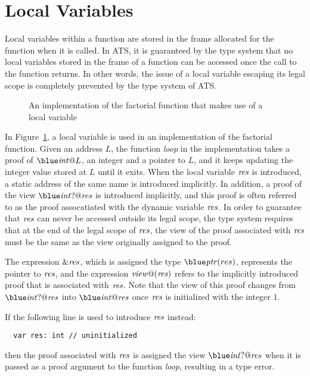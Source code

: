 \section{Local Variables}
Local variables within a function are stored in the frame allocated for the
function when it is called. In ATS, it is guaranteed by the type system
that no local variables stored in the frame of a function can be accessed
once the call to the function returns. In other words, the issue of a local
variable escaping its legal scope is completely prevented by the type
system of ATS.

\begin{figure}[thp]

\caption{An implementation of the factorial function that makes use of a local variable}
\label{figure:fact_function_var.dats}
\end{figure}
In Figure~\ref{figure:fact_function_var.dats}, a local variable is used in
an implementation of the factorial function. Given an address $L$, the
function {\it loop} in the implementation takes a proof of $\tint@L$, an
integer and a pointer to $L$, and it keeps updating the integer value
stored at $L$ until it exits. When the local variable ${\it res}$ is
introduced, a static address of the same name is introduced implicitly. In
addition, a proof of the view $\tint?@{\it res}$ is introduced implicitly,
and this proof is often referred to as the proof assocatiated with the
dynamic variable ${\it res}$.  In order to guarantee that ${\it res}$ can
never be accessed outside its legal scope, the type system requires that at
the end of the legal scope of ${\it res}$, the view of the proof associated
with ${\it res}$ must be the same as the view originally assigned to the
proof.

The expression ${\it \&res}$, which is assigned the type $\tptr(res)$,
represents the pointer to ${\it res}$, and the expression ${\it view@}({\it
res})$ refers to the implicitly introduced proof that is associated with
${\it res}$. Note that the view of this proof changes from $\tint?@{\it
res}$ into $\tint@{\it res}$ once ${\it res}$ is initialized with the
integer $1$.

If the following line is used to introduce ${\it res}$
instead:
\begin{verbatim}
  var res: int // uninitialized
\end{verbatim}
then the proof associated with ${\it res}$ is assigned the view
$\tint?@{\it res}$ when it is passed as a proof argument to the function
{\it loop}, resulting in a type error.

